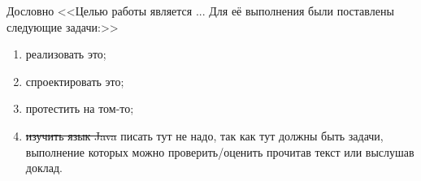  Дословно <<Целью работы является ... Для её выполнения были поставлены следующие задачи:>>
 \begin{enumerate}
 \item  реализовать это;
 \item  спроектировать это;
 \item  протестить на том-то;
 \item \sout{изучить язык Java} писать тут не надо, так как тут должны быть задачи, выполнение которых можно проверить/оценить прочитав текст или выслушав доклад.
 \end{enumerate}
